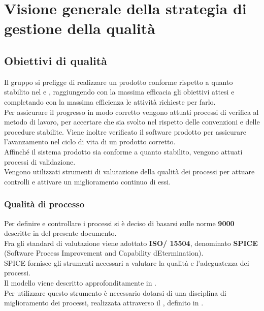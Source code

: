 \section{Visione generale della strategia di gestione della qualità}
\subsection{Obiettivi di qualità}
Il gruppo si prefigge di realizzare un prodotto conforme rispetto a quanto stabilito nel \PianoDiQualifica{} e \AnalisiDeiRequisiti{}, raggiungendo con la massima efficacia gli obiettivi attesi e completando con la massima efficienza le attività richieste per farlo.\\
Per assicurare il progresso in modo corretto vengono attuati processi di verifica al metodo di lavoro, per accertare che sia svolto nel rispetto delle convenzioni e delle procedure stabilite. Viene inoltre verificato il software prodotto per assicurare l'avanzamento nel ciclo di vita di un prodotto corretto.\\
Affinché il sistema prodotto sia conforme a quanto stabilito, vengono attuati processi di validazione.\\
Vengono utilizzati strumenti di valutazione della qualità dei processi per attuare controlli e attivare un miglioramento continuo di essi.

\subsubsection{Qualità di processo}
Per definire e controllare i processi si è deciso di basarsi sulle norme \textbf{ 9000} descritte in  del presente documento.\\
Fra gli standard di valutazione viene adottato \textbf{ISO/ 15504}, denominato \textbf{SPICE} (Software Process Improvement and Capability dEtermination).\\
SPICE fornisce gli strumenti necessari a valutare la qualità e l'adeguatezza dei processi.\\
Il modello viene descritto approfonditamente in .\\
Per utilizzare questo strumento è necessario dotarsi di una disciplina di miglioramento dei processi, realizzata attraverso il , definito in .

